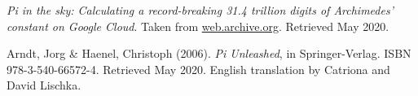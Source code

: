 \documentclass[12pt]{article}
\begin{document}
\begin{thebibliography}{9} %
  

  \textit{Pi in the sky: Calculating a record-breaking 31.4 trillion digits of Archimedes' constant on Google Cloud}.
  Taken from \href{https://web.archive.org/web/20191019023120/https://cloud.google.com/blog/products/compute/calculating-31-4-trillion-digits-of-archimedes-constant-on-google-cloud}{web.archive.org}.
  Retrieved May 2020.

  Arndt, Jorg \& Haenel, Christoph (2006).
  \textit{Pi Unleashed}, in Springer-Verlag.
  ISBN 978-3-540-66572-4.
  Retrieved May 2020.
  English translation by Catriona and David Lischka.


\end{thebibliography}

\clearpage
\end{document}
